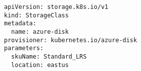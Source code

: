 \begin{verbatim}
apiVersion: storage.k8s.io/v1
kind: StorageClass
metadata:
  name: azure-disk
provisioner: kubernetes.io/azure-disk
parameters:
  skuName: Standard_LRS
  location: eastus
\end{verbatim}